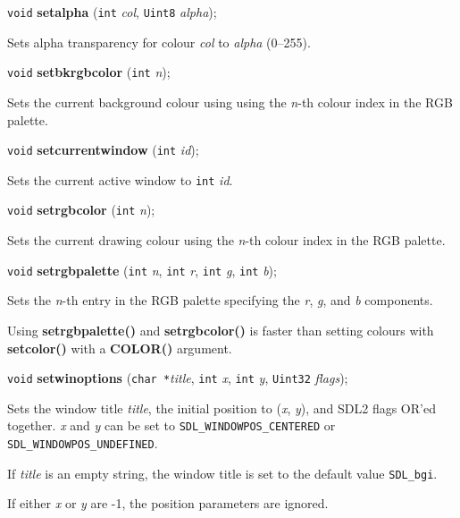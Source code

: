 \documentclass[a4paper,11pt]{article}
\newcommand{\V}{\texttt{void}}      %
\newcommand{\I}{\texttt{int}}       %
\newcommand{\Ue}{\texttt{Uint8}}    %
\newcommand{\Ut}{\texttt{Uint32}}   %
\newcommand{\C}{\texttt{char *}}    %
\newcommand{\func}[1]{\textbf{#1}}  %
\newcommand{\A}[1]{\emph{#1}}       %
\newcommand{\T}[1]{\texttt{#1}}     %
\newenvironment{bgi}
{ %
  \begin{snugshade}
}
{ %
  \end{snugshade}
}
\begin{document}

\begin{bgi}
\V{} \func{setalpha} (\I{} \A{col}, \Ue{} \A{alpha}); 
\end{bgi}

Sets alpha transparency for colour \A{col} to \A{alpha} (0--255).


\begin{bgi}
\V{} \func{setbkrgbcolor} (\I{} \A{n}); 
\end{bgi}

Sets the current background colour using using the \A{n}-th colour
index in the RGB palette.

\begin{bgi}
\V{} \func{setcurrentwindow} (\I{} \A{id}); 
\end{bgi}

Sets the current active window to \I{} \A{id}.


\begin{bgi}
\V{} \func{setrgbcolor} (\I{} \A{n}); 
\end{bgi}

Sets the current drawing colour using the \A{n}-th colour index in the
RGB palette.


\begin{bgi}
\V{} \func{setrgbpalette} (\I{} \A{n}, \I{} \A{r}, \I{} \A{g}, \I{} \A{b}); 
\end{bgi}

Sets the \A{n}-th entry in the RGB palette specifying the \A{r},
\A{g}, and \A{b} components.

Using \func{setrgbpalette()} and \func{setrgbcolor()} is faster than
setting colours with \func{setcolor()} with a \func{COLOR()} argument.


\begin{bgi}
\V{} \func{setwinoptions} (\C{}\A{title}, \I{} \A{x}, \I{} \A{y}, 
  \Ut{} \A{flags});
\end{bgi}

Sets the window title \A{title}, the initial position to (\A{x},
\A{y}), and SDL2 flags OR'ed together. \A{x} and \A{y} can be set to
\T{SDL\_WINDOWPOS\_CENTERED} or \T{SDL\_WINDOWPOS\_UNDEFINED}.

If \A{title} is an empty string, the window title is set to the
default value \T{SDL\_bgi}.

If either \A{x} or \A{y} are -1, the position parameters are ignored.
\end{document}
